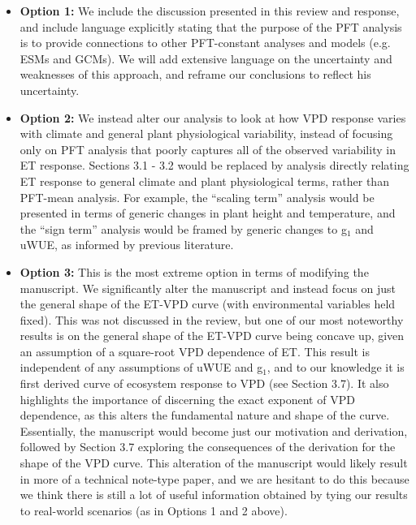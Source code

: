 \documentclass[12pt]{article}
\begin{document}
\begin{itemize}
\item \textbf{Option 1:} We include the discussion presented in this
  review and response, and include language explicitly stating that
  the purpose of the PFT analysis is to provide connections to other
  PFT-constant analyses and models (e.g. ESMs and GCMs). We will add
  extensive language on the uncertainty and weaknesses of this
  approach, and reframe our conclusions to reflect his uncertainty.
\item \textbf{Option 2:} We instead alter our analysis to look at how
  VPD response varies with climate and general plant physiological
  variability, instead of focusing only on PFT analysis that poorly
  captures all of the observed variability in ET response. Sections
  3.1 - 3.2 would be replaced by analysis directly relating ET
  response to general climate and plant physiological terms, rather
  than PFT-mean analysis. For example, the ``scaling term'' analysis
  would be presented in terms of generic changes in plant height and
  temperature, and the ``sign term'' analysis would be framed by
  generic changes to g$_1$ and uWUE, as informed by previous
  literature.
\item \textbf{Option 3:} This is the most extreme option in terms of
  modifying the manuscript. We significantly alter the manuscript and
  instead focus on just the general shape of the ET-VPD curve (with
  environmental variables held fixed). This was not discussed in the
  review, but one of our most noteworthy results is on the general
  shape of the ET-VPD curve being concave up, given an assumption of a
  square-root VPD dependence of ET. This result is independent of any
  assumptions of uWUE and g$_1$, and to our knowledge it is first
  derived curve of ecosystem response to VPD (see Section 3.7). It
  also highlights the importance of discerning the exact exponent of
  VPD dependence, as this alters the fundamental nature and shape of
  the curve. Essentially, the manuscript would become just our
  motivation and derivation, followed by Section 3.7 exploring the
  consequences of the derivation for the shape of the VPD curve. This
  alteration of the manuscript would likely result in more of a
  technical note-type paper, and we are hesitant to do this because we
  think there is still a lot of useful information obtained by tying
  our results to real-world scenarios (as in Options 1 and 2 above).
\end{itemize}
\end{document}

